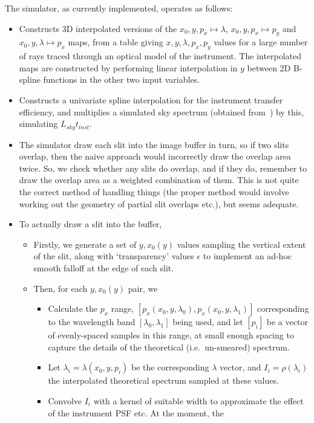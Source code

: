 The simulator, as currently implemented, operates as follows:
%
\begin{itemize}
\item Constructs 3D interpolated versions of the $x_0, y, p_x \mapsto
\lambda$, $x_0, y, p_x \mapsto p_y$ and $x_0, y, \lambda \mapsto p_x$
maps, from a table giving $x, y, \lambda, p_x, p_y$ values for a large
number of rays traced through an optical model of the instrument. The
interpolated maps are constructed by performing linear interpolation in
$y$ between 2D B-spline functions in the other two input variables.
%
\item Constructs a univariate spline interpolation for the instrument
transfer efficiency, and multiplies a simulated sky spectrum (obtained
from~\cite{geminibackground}) by this, simulating $L_{sky} t_{inst}$.
%
\item
The simulator draw each slit into the image buffer in turn, so if two
slits overlap, then the naive approach would incorrectly draw the
overlap area twice. So, we check whether any slits do overlap, and if
they do, remember to draw the overlap area as a weighted combination
of them. This is not quite the correct method of handling things (the
proper method would involve working out the geometry of partial slit
overlaps etc.), but seems adequate.
%
\item
To actually draw a slit into the buffer,
\begin{itemize}
\item Firstly, we generate a set of $y, x_0(y)$ values sampling the vertical
extent of the slit, along with `transparency' values $\epsilon$ to implement
an ad-hoc smooth falloff at the edge of each slit.
%
\item Then, for each $y, x_0(y)$ pair, we
\begin{itemize}
\item Calculate the $p_x$ range, $[p_x(x_0, y, \lambda_0), p_x (x_0, y, \lambda_1)]$
corresponding to the wavelength band $[\lambda_0, \lambda_1]$ being used, and
let $[p_i]$ be a vector of evenly-spaced samples in this range, at small enough
spacing to capture the details of the theoretical (i.e.\ un-smeared) spectrum.
%
\item Let $\lambda_i = \lambda (x_0, y, p_i)$ be the corresponding
$\lambda$ vector, and $I_i = \rho (\lambda_i)$ the interpolated
theoretical spectrum sampled at these values.
%
\item Convolve $I_i$ with a kernel of suitable width to
approximate the effect of the instrument PSF etc. At the moment, the

\end{itemize}
\end{itemize}
\end{itemize}
